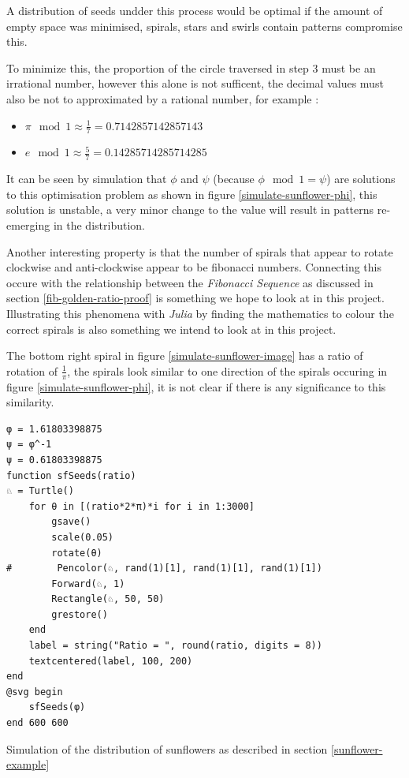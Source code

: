 \documentclass[11pt]{article}
\begin{document}
A distribution of seeds undder this process would be optimal if the amount of empty space was minimised, spirals, stars and swirls contain patterns compromise this.

To minimize this, the proportion of the circle traversed in step 3 must be an
irrational number, however this alone is not sufficent, the decimal values must
also be not to approximated by a rational number, for example
\cite{NatureGoldenRatio2018}:

\begin{itemize}
\item \(\pi \mod 1 \approx \frac{1}{7}=0.7142857142857143\)
\item \(e \mod 1 \approx \frac{5}{7}= 0.14285714285714285\)
\end{itemize}

It can be seen by simulation that \(\phi\) and \(\psi\) (because \(\phi \mod 1 =
\psi\)) are solutions to this optimisation problem as shown in figure
\ref{simulate-sunflower-phi}, this solution is unstable, a very minor change to the
value will result in patterns re-emerging in the distribution.

Another interesting property is that the number of spirals that appear to rotate
clockwise and anti-clockwise appear to be fibonacci numbers. Connecting this
occure with the relationship between the \emph{Fibonacci Sequence} as discussed in
section \ref{fib-golden-ratio-proof} is something we hope to look at in this project.
Illustrating this phenomena with \emph{Julia} by finding the mathematics to colour
the correct spirals is also something we intend to look at in this project.

The bottom right spiral in figure \ref{simulate-sunflower-image} has a ratio of rotation of \(\frac{1}{\pi}\), the spirals look similar to one direction of the spirals occuring in figure \ref{simulate-sunflower-phi}, it is not clear if there is any significance to this similarity.

\begin{listing}[htbp]
\begin{verbatim}
φ = 1.61803398875
ψ = φ^-1
ψ = 0.61803398875
function sfSeeds(ratio)
♘ = Turtle()
    for θ in [(ratio*2*π)*i for i in 1:3000]
        gsave()
        scale(0.05)
        rotate(θ)
#        Pencolor(♘, rand(1)[1], rand(1)[1], rand(1)[1])
        Forward(♘, 1)
        Rectangle(♘, 50, 50)
        grestore()
    end
    label = string("Ratio = ", round(ratio, digits = 8))
    textcentered(label, 100, 200)
end
@svg begin
    sfSeeds(φ)
end 600 600
\end{verbatim}
\caption{\label{simulate-sunflower}Simulation of the distribution of sunflowers as described in section \ref{sunflower-example}}
\end{listing}
\end{document}
